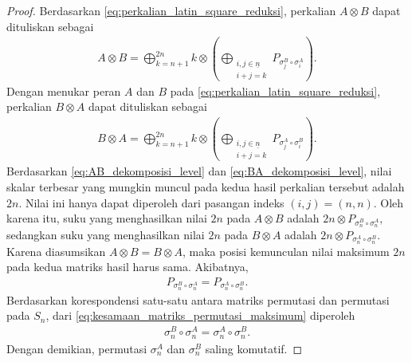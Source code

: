 \begin{proof}
  Berdasarkan \eqref{eq:perkalian_latin_square_reduksi}, perkalian $A \otimes B$ dapat dituliskan sebagai
  \begin{align}\label{eq:AB_dekomposisi_level}
    A \otimes B
    =
    \bigoplus_{k=n+1}^{2n}
    k \otimes
    \left(
    \bigoplus_{\substack{i,j \in \underline{n} \\ i+j=k}}
    P_{\sigma_j^B \circ \sigma_i^A}
    \right).
  \end{align}
  Dengan menukar peran $A$ dan $B$ pada \eqref{eq:perkalian_latin_square_reduksi}, perkalian $B \otimes A$ dapat dituliskan sebagai
  \begin{align}\label{eq:BA_dekomposisi_level}
    B \otimes A
    =
    \bigoplus_{k=n+1}^{2n}
    k \otimes
    \left(
    \bigoplus_{\substack{i,j \in \underline{n} \\ i+j=k}}
    P_{\sigma_j^A \circ \sigma_i^B}
    \right).
  \end{align}
  Berdasarkan \eqref{eq:AB_dekomposisi_level} dan \eqref{eq:BA_dekomposisi_level}, nilai skalar terbesar yang mungkin muncul pada kedua hasil perkalian tersebut adalah $2n$. Nilai ini hanya dapat diperoleh dari pasangan indeks $(i,j)=(n,n)$. Oleh karena itu, suku yang menghasilkan nilai $2n$ pada $A\otimes B$ adalah
  $
    2n \otimes P_{\sigma_n^B \circ \sigma_n^A},
  $
  sedangkan suku yang menghasilkan nilai $2n$ pada $B\otimes A$ adalah
  $
    2n \otimes P_{\sigma_n^A \circ \sigma_n^B}.
  $
  Karena diasumsikan $A \otimes B = B \otimes A$, maka posisi kemunculan nilai maksimum $2n$ pada kedua matriks hasil harus sama. Akibatnya,
  \begin{align}\label{eq:kesamaan_matriks_permutasi_maksimum}
    P_{\sigma_n^B \circ \sigma_n^A}
    =
    P_{\sigma_n^A \circ \sigma_n^B}.
  \end{align}
  Berdasarkan korespondensi satu-satu antara matriks permutasi dan permutasi pada $S_n$, dari \eqref{eq:kesamaan_matriks_permutasi_maksimum} diperoleh
  \begin{align}\label{eq:komutatif_permutasi_maksimum}
    \sigma_n^B \circ \sigma_n^A
    =
    \sigma_n^A \circ \sigma_n^B.
  \end{align}
  Dengan demikian, permutasi $\sigma_n^A$ dan $\sigma_n^B$ saling komutatif.
\end{proof}

